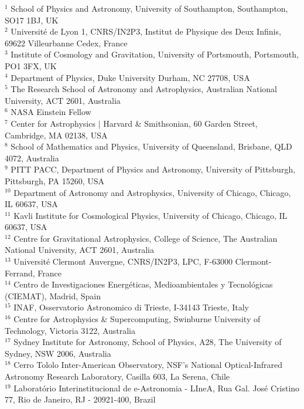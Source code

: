 \documentclass[fleqn,usenatbib]{mnras}
\begin{document}
\parbox{\textwidth}{
\scriptsize
$^{1}$ School of Physics and Astronomy, University of Southampton,  Southampton, SO17 1BJ, UK\\
$^{2}$ Universit\'e de Lyon 1, CNRS/IN2P3, Institut de Physique des Deux Infinis, 69622 Villeurbanne Cedex, France\\
$^{3}$ Institute of Cosmology and Gravitation, University of Portsmouth, Portsmouth, PO1 3FX, UK\\
$^{4}$ Department of Physics, Duke University Durham, NC 27708, USA\\
$^{5}$ The Research School of Astronomy and Astrophysics, Australian National University, ACT 2601, Australia\\
$^{6}$ NASA Einstein Fellow\\
$^{7}$ Center for Astrophysics $\vert$ Harvard \& Smithsonian, 60 Garden Street, Cambridge, MA 02138, USA\\
$^{8}$ School of Mathematics and Physics, University of Queensland,  Brisbane, QLD 4072, Australia\\
$^{9}$ PITT PACC, Department of Physics and Astronomy, University of Pittsburgh, Pittsburgh, PA 15260, USA\\
$^{10}$ Department of Astronomy and Astrophysics, University of Chicago, Chicago, IL 60637, USA\\
$^{11}$ Kavli Institute for Cosmological Physics, University of Chicago, Chicago, IL 60637, USA\\
$^{12}$ Centre for Gravitational Astrophysics, College of Science, The Australian National University, ACT 2601, Australia\\
$^{13}$ Universit\'e Clermont Auvergne, CNRS/IN2P3, LPC, F-63000 Clermont-Ferrand, France\\
$^{14}$ Centro de Investigaciones Energ\'eticas, Medioambientales y Tecnol\'ogicas (CIEMAT), Madrid, Spain\\
$^{15}$ INAF, Osservatorio Astronomico di Trieste, I-34143 Trieste, Italy\\
$^{16}$ Centre for Astrophysics \& Supercomputing, Swinburne University of Technology, Victoria 3122, Australia\\
$^{17}$ Sydney Institute for Astronomy, School of Physics, A28, The University of Sydney, NSW 2006, Australia\\
$^{18}$ Cerro Tololo Inter-American Observatory, NSF's National Optical-Infrared Astronomy Research Laboratory, Casilla 603, La Serena, Chile\\
$^{19}$ Laborat\'orio Interinstitucional de e-Astronomia - LIneA, Rua Gal. Jos\'e Cristino 77, Rio de Janeiro, RJ - 20921-400, Brazil\\
}
\end{document}
